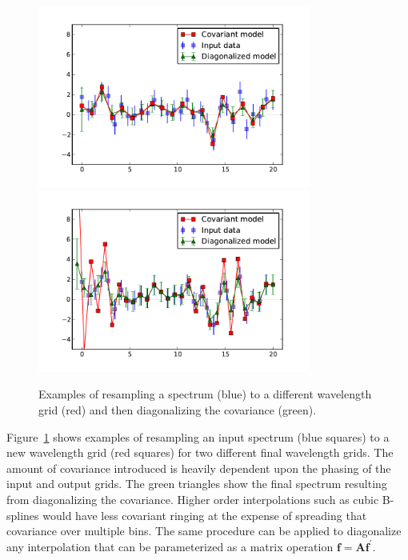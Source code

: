 \documentclass[12pt]{article}
\newcommand{\A}{\mathbf{A}}
\newcommand{\f}{\mathbf{f}}
\begin{document}
\begin{figure}[t]
\centering
\includegraphics[width=0.8\textwidth]{plots/single_spec_1.pdf}
\includegraphics[width=0.8\textwidth]{plots/single_spec_2.pdf}
\caption{
Examples of resampling a spectrum (blue) to a different
wavelength grid (red) and then diagonalizing the covariance (green).
}
\label{fig:resample_spectrum}
\end{figure}

Figure~\ref{fig:resample_spectrum} shows examples of resampling an
input spectrum (blue squares) to a new wavelength grid (red squares)
for two different final wavelength grids.
The amount of covariance introduced is heavily dependent upon the
phasing of the input and output grids.  The green triangles show the
final spectrum resulting from diagonalizing the covariance.
Higher order interpolations such as cubic B-splines would have
less covariant ringing at the expense of spreading that covariance
over multiple bins.  The same procedure can be applied to diagonalize
any interpolation that can be parameterized as a matrix operation
$\f = \A \f^\prime$.

\end{document}
